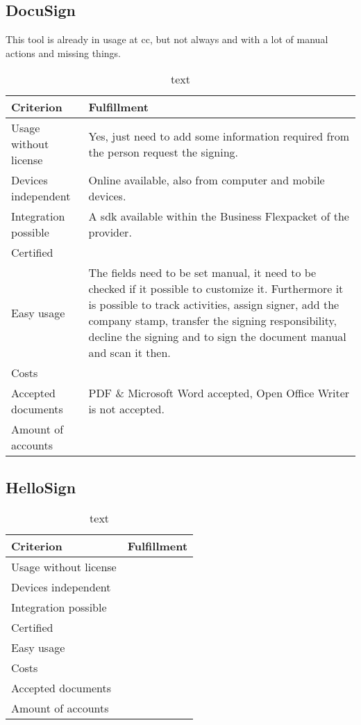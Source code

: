 \subsection{DocuSign}
This tool is already in usage at \gls{cc}, but not always and with a lot of manual actions and missing things. 

\begin{table}[h]
	\begin{tabular}{|p{4cm}|p{10cm}|} \hline
		Criterion & Fulfillment \\ \hline
		Usage without license & Yes, just need to add some information required from the person request the signing.\\ \hline
		Devices independent & Online available, also from computer and mobile devices. \\ \hline
		Integration possible & A \gls{sdk} available within the \grqq Business Flex\grqq packet of the provider.\\ \hline
		Certified & \\ \hline
		Easy usage & The fields need to be set manual, it need to be checked if it possible to customize it. Furthermore it is possible to track activities, assign signer, add the company stamp, transfer the signing responsibility, decline the signing and to sign the document manual and scan it then. \\ \hline
		Costs & \\ \hline
		Accepted documents & PDF \& Microsoft Word accepted, Open Office Writer is not accepted. \\ \hline
		Amount of accounts & \\ \hline
	\end{tabular}
	\caption{text}
	\label{key}
\end{table}

\subsection{HelloSign}


\begin{table}[h]
	\begin{tabular}{|p{4cm}|p{10cm}|} \hline
		Criterion & Fulfillment \\ \hline
		Usage without license & \\ \hline
		Devices independent & \\ \hline
		Integration possible & \\ \hline
		Certified & \\ \hline
		Easy usage & \\ \hline
		Costs & \\ \hline
		Accepted documents & \\ \hline
		Amount of accounts & \\ \hline
	\end{tabular}
	\caption{text}
	\label{key}
\end{table}

